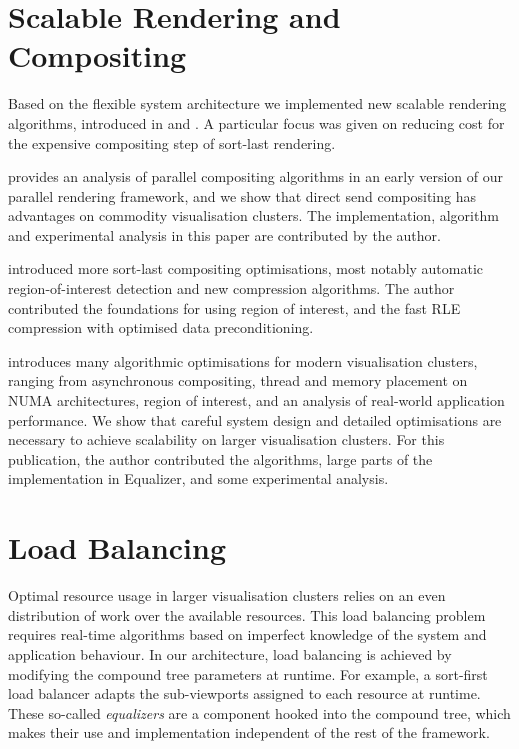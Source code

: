 \section{Scalable Rendering and Compositing}

Based on the flexible system architecture we implemented new scalable rendering
algorithms, introduced in \cite{EMP:09} and \cite{ESP:18}. A particular focus
was given on reducing cost for the expensive compositing step of sort-last
rendering.

\cite{EP:07} provides an analysis of parallel compositing algorithms in an
early version of our parallel rendering framework, and we show that direct send
compositing has advantages on commodity visualisation clusters. The
implementation, algorithm and experimental analysis in this paper are
contributed by the author.

\cite{MEP:10} introduced more sort-last compositing optimisations, most notably
automatic region-of-interest detection and new compression algorithms. The
author contributed the foundations for using region of interest, and the fast
RLE compression with optimised data preconditioning.

\cite{EBAHMP:12} introduces many algorithmic optimisations for modern
visualisation clusters, ranging from asynchronous compositing, thread and
memory placement on NUMA architectures, region of interest, and an analysis of
real-world application performance. We show that careful system design and
detailed optimisations are necessary to achieve scalability on larger
visualisation clusters. For this publication, the author contributed the
algorithms, large parts of the implementation in Equalizer, and some
experimental analysis.

\section{Load Balancing}

Optimal resource usage in larger visualisation clusters relies on an even
distribution of work over the available resources. This load balancing problem
requires real-time algorithms based on imperfect knowledge of the system and
application behaviour. In our architecture, load balancing is achieved by modifying
the compound tree parameters at runtime. For example, a sort-first load balancer
adapts the sub-viewports assigned to each resource at runtime. These so-called
{\em equalizers} are a component hooked into the compound tree, which makes
their use and implementation independent of the rest of the framework.

